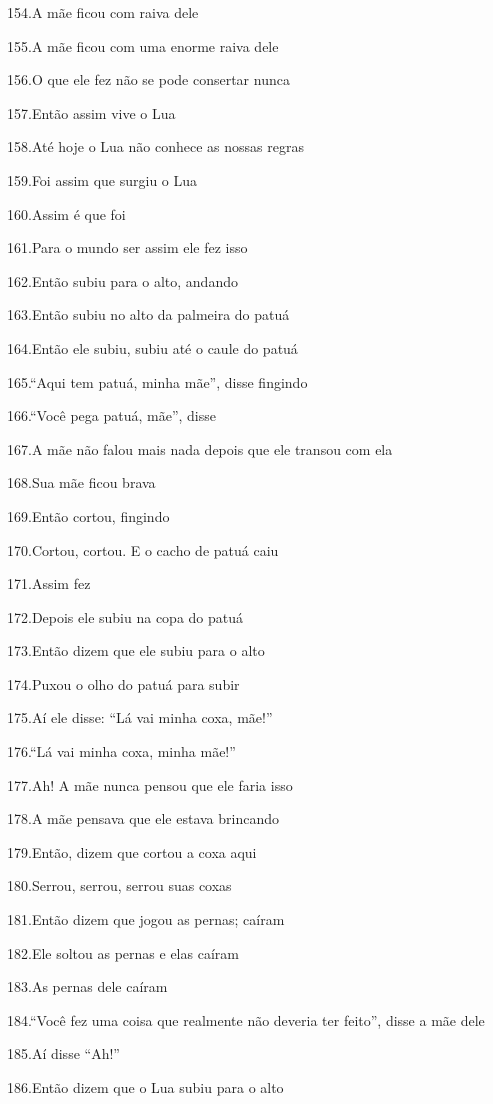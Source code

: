154.A mãe ficou com raiva dele

155.A mãe ficou com uma enorme raiva dele

156.O que ele fez não se pode consertar nunca

157.Então assim vive o Lua

158.Até hoje o Lua não conhece as nossas regras

159.Foi assim que surgiu o Lua

160.Assim é que foi

161.Para o mundo ser assim ele fez isso

162.Então subiu para o alto, andando

163.Então subiu no alto da palmeira do patuá

164.Então ele subiu, subiu até o caule do patuá

165.``Aqui tem patuá, minha mãe'', disse fingindo

166.``Você pega patuá, mãe'', disse

167.A mãe não falou mais nada depois que ele transou com ela

168.Sua mãe ficou brava

169.Então cortou, fingindo

170.Cortou, cortou. E o cacho de patuá caiu

171.Assim fez

172.Depois ele subiu na copa do patuá

173.Então dizem que ele subiu para o alto

174.Puxou o olho do patuá para subir

175.Aí ele disse: ``Lá vai minha coxa, mãe!''

176.``Lá vai minha coxa, minha mãe!''

177.Ah! A mãe nunca pensou que ele faria isso

178.A mãe pensava que ele estava brincando

179.Então, dizem que cortou a coxa aqui

180.Serrou, serrou, serrou suas coxas

181.Então dizem que jogou as pernas; caíram

182.Ele soltou as pernas e elas caíram

183.As pernas dele caíram

184.``Você fez uma coisa que realmente não deveria ter feito'', disse a
mãe dele

185.Aí disse ``Ah!''

186.Então dizem que o Lua subiu para o alto

